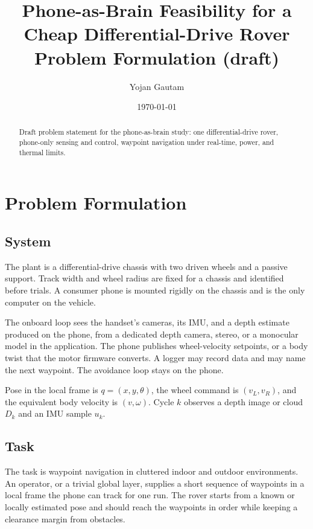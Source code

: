 \documentclass[11pt,a4paper]{article}
\title{Phone-as-Brain Feasibility for a Cheap Differential-Drive Rover\\
\large Problem Formulation (draft)}
\author{Yojan Gautam}
\date{\today}
\begin{document}
\maketitle

\begin{abstract}
\noindent
Draft problem statement for the phone-as-brain study: one differential-drive rover, phone-only sensing and control, waypoint navigation under real-time, power, and thermal limits.
\end{abstract}

\section{Problem Formulation}
\label{sec:problem}

\subsection{System}
\label{sec:system}

The plant is a differential-drive chassis with two driven wheels and a passive support.
Track width and wheel radius are fixed for a chassis and identified before trials.
A consumer phone is mounted rigidly on the chassis and is the only computer on the vehicle.

The onboard loop sees the handset's cameras, its IMU, and a depth estimate produced on the phone, from a dedicated depth camera, stereo, or a monocular model in the application.
The phone publishes wheel-velocity setpoints, or a body twist that the motor firmware converts.
A logger may record data and may name the next waypoint.
The avoidance loop stays on the phone.

Pose in the local frame is \(q = (x, y, \theta)\), the wheel command is \((v_L, v_R)\), and the equivalent body velocity is \((v, \omega)\).
Cycle \(k\) observes a depth image or cloud \(D_k\) and an IMU sample \(u_k\).

\subsection{Task}
\label{sec:task}

The task is waypoint navigation in cluttered indoor and outdoor environments.
An operator, or a trivial global layer, supplies a short sequence of waypoints in a local frame the phone can track for one run.
The rover starts from a known or locally estimated pose and should reach the waypoints in order while keeping a clearance margin from obstacles.
\end{document}
